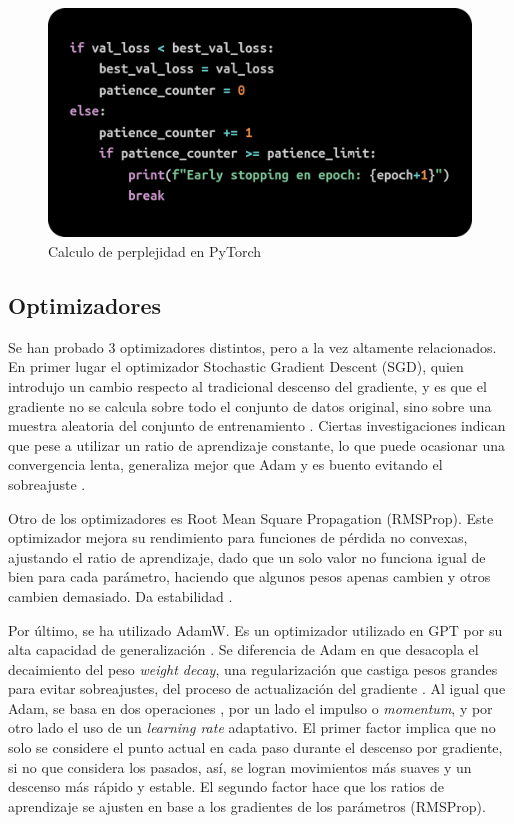 \documentclass[11pt]{book}
\begin{document}
\begin{figure}[h]
    \centering
    \includegraphics[width=0.5\linewidth]{img/early_stop.png}
    \caption{Calculo de perplejidad en PyTorch \parencite{stackoverflow_perplexity_pytorch}}
    \label{fig:placeholder23}
\end{figure}

\subsection{Optimizadores}

Se han probado 3 optimizadores distintos, pero a la vez altamente relacionados. En primer lugar el optimizador Stochastic Gradient Descent (SGD), quien introdujo un cambio respecto al tradicional descenso del gradiente, y es que el gradiente no se calcula sobre todo el conjunto de datos original, sino sobre una muestra aleatoria del conjunto de entrenamiento \parencite{geeksforgeeks_sgd}. Ciertas investigaciones indican que pese a utilizar un ratio de aprendizaje constante, lo que puede ocasionar una convergencia lenta, generaliza mejor que Adam y es buento evitando el sobreajuste \parencite{ultralytics_adam_glossary}. 

Otro de los optimizadores es Root Mean Square Propagation (RMSProp). Este optimizador mejora su rendimiento para funciones de pérdida no convexas, ajustando el ratio de aprendizaje, dado que un solo valor no funciona igual de bien para cada parámetro, haciendo que algunos pesos apenas cambien y otros cambien demasiado. Da estabilidad \parencite{kashyap2024rmsprop}.

Por último, se ha utilizado AdamW. Es un optimizador utilizado en GPT por su alta capacidad de generalización . Se diferencia de Adam en que desacopla el decaimiento del peso \textit{weight decay}, una regularización que castiga pesos grandes para evitar sobreajustes, del proceso de actualización del gradiente \parencite{datacamp_adamw_pytorch}.  Al igual que Adam, se basa en dos operaciones \parencite{yassin2024adamvsadamw}, por un lado el impulso o \textit{momentum}, y por otro lado el uso de un \textit{learning rate} adaptativo. El primer factor implica que no solo se considere el punto actual en cada paso durante el descenso por gradiente, si no que considera los pasados, así, se logran movimientos más suaves y un descenso más rápido y estable. El segundo factor hace que los ratios de aprendizaje se ajusten en base a los gradientes de los parámetros (RMSProp).
\end{document}
